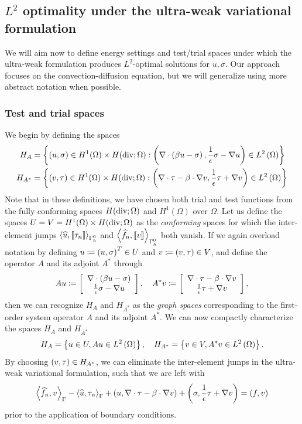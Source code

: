 \subsection{$L^2$ optimality under the ultra-weak variational formulation}
We will aim now to define energy settings and test/trial spaces under which the ultra-weak formulation produces $L^2$-optimal solutions for $u,\sigma$.  Our approach focuses on the convection-diffusion equation, but we will generalize using more abstract notation when possible.  

\subsubsection{Test and trial spaces}
We begin by defining the spaces
\begin{align*}
H_A &= \LRc{\LRp{u, \sigma} \in H^1(\Omega) \times H({\rm div};\Omega): \LRp{\div\LRp{\beta u - \sigma}, \frac{1}{\epsilon}\sigma - \grad u}  \in L^2\LRp{\Omega}}\\
H_{A^*} &= \LRc{\LRp{v,\tau} \in H^1(\Omega)\times H({\rm div};\Omega): \LRp{\div \tau - \beta\cdot \Grad v, \frac{1}{\epsilon}\tau + \Grad v} \in L^2\LRp{\Omega}}
\end{align*}
Note that in these definitions, we have chosen both trial and test functions from the fully conforming spaces $H({\rm div};\Omega)$ and $H^1(\Omega)$ over $\Omega$.  Let us define the spaces ${U} = {V} = H^1(\Omega) \times H({\rm div};\Omega)$ as the \textit{conforming} spaces for which the inter-element jumps $\LRa{\uh,\jump{\tau_n}}_{\Gh^0}$ and $\LRa{\fnh,\jump{v}}_{\Gh^0}$ both vanish.  If we again overload notation by defining ${u} \coloneqq \LRp{u,\sigma}^T\in {U}$ and ${v} \coloneqq \LRp{v,\tau} \in {V}$, and define the operator $A$ and its adjoint $A^*$ through
\[
A{u} \coloneqq \vecttwo{\div\LRp{\beta u - \sigma}}{\frac{1}{\epsilon}\sigma - \grad u}, \quad A^*{v} \coloneqq \vecttwo{\div \tau - \beta\cdot \Grad v}{\frac{1}{\epsilon}\tau + \Grad v},
\]
then we can recognize $H_A$ and $H_{A^*}$ as the \textit{graph spaces} corresponding to the first-order system operator $A$ and its adjoint $A^*$. We can now compactly characterize the spaces $H_A$ and $H_{A^*}$
\[
H_A = \LRc{{u} \in {U}, A{u} \in L^2\LRp{\Omega}}, \quad H_{A^*} = \LRc{{v} \in  {V}, A^*{v} \in L^2\LRp{\Omega}}.
\]
By choosing $\LRp{v,\tau}\in H_{A^*}$, we can eliminate the inter-element jumps in the ultra-weak variational formulation, such that we are left with
\begin{align*}
\LRa{\fnh,v}_{\Gamma} - \LRa{\uh,\tau_n}_{\Gamma} + \LRp{u, \Grad\cdot \tau - \beta\cdot \Grad v} + \LRp{\sigma, \frac{1}{\epsilon}\tau + \Grad v} = \LRp{f,v}
\end{align*}
prior to the application of boundary conditions.  

